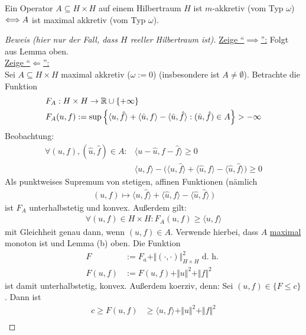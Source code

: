 \begin{theorem}[Minty]\enter
Ein Operator $A\subseteq H\times H$ auf einem Hilbertraum $H$ ist $m$-akkretiv (vom Typ $\omega$) $\Longleftrightarrow\\ A$ ist maximal akkretiv (vom Typ $\omega$).
\end{theorem}
\begin{proof}[Beweis (hier nur der Fall, dass $H$ reeller Hilbertraum ist)]\enter
\underline{Zeige ``$\implies$'':} Folgt aus Lemma oben.\\

\underline{Zeige ``$\Longleftarrow$'':}\\
Sei $A\subseteq H\times H$ maximal akkretiv ($\omega:=0$) (insbesondere ist $A\neq\emptyset$). Betrachte die Funktion 
\begin{align*}
&F_A:H\times H\to\mathbb{R}\cup\lbrace+\infty\rbrace\\
&F_A(u,f):=\sup\Big\lbrace\langle u,\hat{f}\rangle+\langle\hat{u},f\rangle-\langle\hat{u},\hat{f}\rangle:(\hat{u},\hat{f})\in A\Big\rbrace>-\infty
\end{align*}
Beobachtung: 
\begin{align*}
\forall (u,f),(\hat{u},\hat{f})\in A:
&\big\langle u-\hat{u},f-\hat{f}\big\rangle\geq0\\
&\langle u,f\rangle-\Big(\big\langle u,\hat{f}\big\rangle+\big\langle\hat{u},f\big\rangle-\big\langle\hat{u},\hat{f}\big\rangle\Big)\geq0
\end{align*}
Als punktweises Supremum von stetigen, affinen Funktionen (nämlich 
\begin{align*}
(u,f)\mapsto\big\langle u,\hat{f}\big\rangle+\big\langle\hat{u},f\big\rangle-\big\langle\hat{u},\hat{f}\big\rangle~\big)
\end{align*}
ist $F_A$ unterhalbstetig und konvex. Außerdem gilt:
\begin{align*}
\forall (u,f)\in H\times H:F_A(u,f)\geq\langle u,f\rangle
\end{align*}
mit Gleichheit genau dann, wenn $(u,f)\in A$. Verwende hierbei, dass $A$ \ul{maximal} monoton ist und Lemma (b) oben. Die Funktion
\begin{align*}
F&:=F_a+\Vert(\cdot,\cdot)\Vert^2_{H\times H}\text{ d. h. }\\
F(u,f)&:=F(u,f)+\Vert u\Vert^2+\Vert f\Vert^2
\end{align*}
ist damit unterhalbstetig, konvex. Außerdem koerziv, denn: Sei $(u,f)\in\lbrace F\leq c\rbrace$. Dann ist
\begin{align*}
c\geq F(u,f)
&\geq\langle u,f\rangle+\Vert u\Vert^2+\Vert f\Vert^2\\

\end{align*}
\end{proof}

